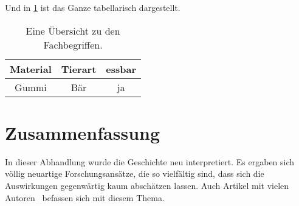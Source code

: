 \documentclass[ngerman]{seminarvorlage}
\begin{document}
Und in \cref{tttabelle} ist das Ganze tabellarisch dargestellt.

\begin{table}[hp]\large
\begin{center}
\begin{tabular}{|c|c|c|}
\hline
Material & Tierart & essbar\\
\hline
Gummi & Bär & ja\\
\hline
\end{tabular}
\end{center}
\caption{Eine Übersicht zu den Fachbegriffen.}
\label{tttabelle}
\end{table}

\section{Zusammenfassung}
In dieser Abhandlung wurde die Geschichte neu interpretiert.
Es ergaben sich völlig neuartige Forschungsansätze, die so
vielfältig sind, dass sich die Auswirkungen gegen\-wärtig %
kaum abschätzen lassen. Auch Artikel mit vielen Autoren~\cite{Black1988}
befassen sich mit diesem Thema.

\pagebreak

%
%


\end{document}
